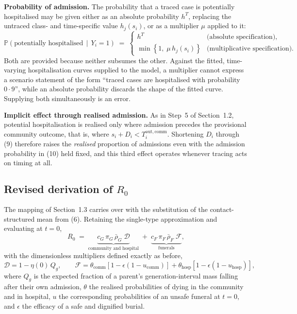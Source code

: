 \documentclass[9pt,letterpaper]{extarticle}
\newcommand{\Prob}{\mathbb{P}}
\begin{document}
\textbf{Probability of admission.} The probability that a traced case is potentially hospitalised may be given either as an absolute probability $h^{T}$, replacing the untraced class- and time-specific value $h_j(s_i)$, or as a multiplier $\mu$ applied to it:
\begin{equation}
\Prob\!\left(\text{potentially hospitalised} \,\middle|\, Y_i = 1\right) \;=\;
\begin{cases}
h^{T} & \text{(absolute specification),}\\
\min\!\left\{1,\; \mu\, h_j(s_i)\right\} & \text{(multiplicative specification).}
\end{cases}
\end{equation}
Both are provided because neither subsumes the other. Against the fitted, time-varying hospitalisation curves supplied to the model, a multiplier cannot express a scenario statement of the form ``traced cases are hospitalised with probability $0{\cdot}9$'', while an absolute probability discards the shape of the fitted curve. Supplying both simultaneously is an error.

\textbf{Implicit effect through realised admission.} As in Step~5 of Section~1.2, potential hospitalisation is realised only where admission precedes the provisional community outcome, that is, where $s_i + D_i < T_i^{\mathrm{out,comm}}$. Shortening $D_i$ through (9) therefore raises the \emph{realised} proportion of admissions even with the admission probability in (10) held fixed, and this third effect operates whenever tracing acts on timing at all.

\subsection{Revised derivation of $R_0$}

The mapping of Section~1.3 carries over with the substitution of the contact-structured mean from (6). Retaining the single-type approximation and evaluating at $t = 0$,
\begin{equation}
R_0 \;=\; \underbrace{c_G\,\pi_G\,\bar{\rho}_G\; \mathcal{D}}_{\text{community and hospital}} \;+\; \underbrace{c_F\,\pi_F\,\bar{\rho}_F\; \mathcal{F}}_{\text{funerals}} ,
\end{equation}
with the dimensionless multipliers defined exactly as before,
\begin{equation}
\mathcal{D} = 1 - \eta(0)\, Q_g ,
\qquad
\mathcal{F} = \theta_{\mathrm{comm}}\!\left[1 - \epsilon(1 - u_{\mathrm{comm}})\right] + \theta_{\mathrm{hosp}}\!\left[1 - \epsilon(1 - u_{\mathrm{hosp}})\right],
\end{equation}
where $Q_g$ is the expected fraction of a parent's generation-interval mass falling after their own admission, $\theta$ the realised probabilities of dying in the community and in hospital, $u$ the corresponding probabilities of an unsafe funeral at $t = 0$, and $\epsilon$ the efficacy of a safe and dignified burial.
\end{document}

